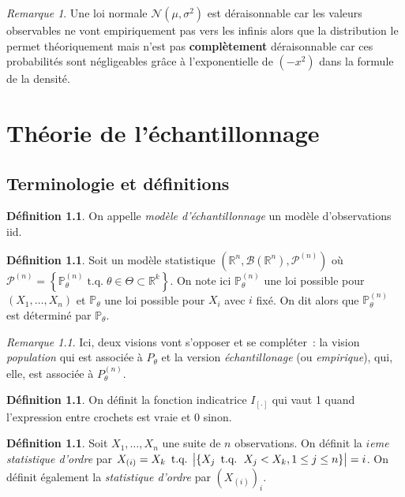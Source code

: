 \documentclass{report}
\DeclareMathOperator{\tq}{\text{ t.q. }}
\renewcommand{\P}{\mathbb P}
\newcommand{\statmod}[4]{\left(#1^{#4}, #2\left(#1^{#4}\right), #3^{\left(#4\right)}\right)}
\newcommand{\Nms}{\mathcal N(\mu, \sigma^2)}
\newcommand{\R}{\mathbb R}
\newcommand{\Brl}{\mathcal B}  %
\theoremstyle{definition}
\newtheorem{déf}[thm]{Définition}
\theoremstyle{remark}
\newtheorem*{rmq}{Remarque}
\begin{document}
	\begin{rmq} Une loi normale $\Nms$ est déraisonnable car les valeurs observables ne vont empiriquement pas vers les infinis alors que la distribution le
	permet théoriquement mais n'est pas \textbf{complètement} déraisonnable car ces probabilités sont négligeables grâce à l'exponentielle de $(-x^2)$ dans la
	formule de la densité.
	\end{rmq}

\chapter{Théorie de l'échantillonnage}
	\section{Terminologie et définitions}
		\begin{déf} On appelle \textit{modèle d'échantillonnage} un modèle d'observations iid.  \end{déf}

		\begin{déf} Soit un modèle statistique $\statmod \R\Brl{\mathcal P}n$ où $\mathcal P^{(n)} =
		\left\{\P_\theta^{(n)} \tq \theta \in \Theta \subset \R^k\right\}$. On note ici $\P^{(n)}_\theta$ une loi possible pour $(X_1, \ldots, X_n)$ et $\P_\theta$
		une loi possible pour $X_i$ avec $i$ fixé. On dit alors que $\P^{(n)}_\theta$ est déterminé par $\P_\theta$.
		\end{déf}

		\begin{rmq} Ici, deux visions vont s'opposer et se compléter~: la vision \textit{population} qui est associée à $P_\theta$ et la version
		\textit{échantillonage} (ou \textit{empirique}), qui, elle, est associée à $P_\theta^{(n)}$.
		\end{rmq}

		\begin{déf} On définit la fonction indicatrice $I_{[\cdot]}$ qui vaut 1 quand l'expression entre crochets est vraie et 0 sinon. \end{déf}

		\begin{déf} Soit $X_1, \ldots, X_n$ une suite de $n$ observations. On définit la \textit{$i$eme statistique d'ordre} par
		$X_{(i)} = X_k \tq \abs {\{X_j \tq X_j < X_k, 1 \leq j \leq n\}} = i$. On définit également la \textit{statistique d'ordre} par $\left(X_{(i)}\right)_i$.
		\end{déf}
\end{document}
